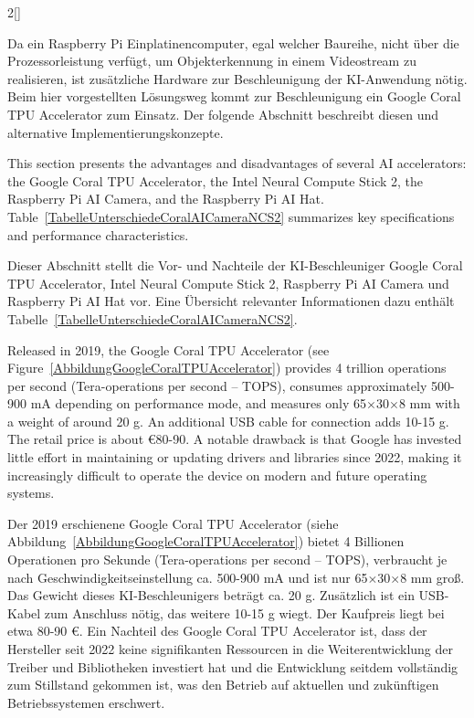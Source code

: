 \begin{paracol}{2}[]
\colger

Da ein Raspberry Pi Einplatinencomputer, egal welcher Baureihe, nicht über die Prozessorleistung verfügt, um Objekterkennung in einem Videostream zu realisieren, ist zusätzliche Hardware zur Beschleunigung der KI-Anwendung nötig. Beim hier vorgestellten Lösungsweg kommt zur Beschleunigung ein Google Coral TPU Accelerator zum Einsatz. Der folgende Abschnitt beschreibt diesen und alternative Implementierungskonzepte.

\colende

\renewcommand{\deutschertitel}{Vergleich von KI-Beschleunigern}
\renewcommand{\englischertitel}{Comparison of AI Accelerators}
\makrounterabschnitt
\label{AbschnittKIBeschleunigerVergleich}

This section presents the advantages and disadvantages of several AI accelerators: the Google Coral TPU Accelerator, the Intel Neural Compute Stick 2, the Raspberry Pi AI Camera, and the Raspberry Pi AI Hat. Table~\ref{TabelleUnterschiedeCoralAICameraNCS2} summarizes key specifications and performance characteristics.

\colger

Dieser Abschnitt stellt die Vor- und Nachteile der KI-Beschleuniger Google Coral TPU Accelerator, Intel Neural Compute Stick 2, Raspberry Pi AI Camera und Raspberry Pi AI Hat vor. Eine Übersicht relevanter Informationen dazu enthält Tabelle~\ref{TabelleUnterschiedeCoralAICameraNCS2}.

\coleng

Released in 2019, the Google Coral TPU Accelerator (see Figure~\ref{AbbildungGoogleCoralTPUAccelerator}) provides 4 trillion operations per second (Tera-operations per second -- TOPS), consumes approximately 500-900 mA depending on performance mode, and measures only 65\(\times\)30\(\times\)8 mm with a weight of around 20 g. An additional USB cable for connection adds 10-15 g. The retail price is about €80-90. A notable drawback is that Google has invested little effort in maintaining or updating drivers and libraries since 2022, making it increasingly difficult to operate the device on modern and future operating systems.

\colger

Der 2019 erschienene Google Coral TPU Accelerator (siehe Abbildung~\ref{AbbildungGoogleCoralTPUAccelerator}) bietet 4 Billionen Operationen pro Sekunde (Tera-operations per second -- TOPS), verbraucht je nach Geschwindigkeitseinstellung ca. 500-900 mA und ist nur 65\(\times\)30\(\times\)8 mm groß. Das Gewicht dieses KI-Beschleunigers beträgt ca. 20 g. Zusätzlich ist ein USB-Kabel zum Anschluss nötig, das weitere 10-15 g wiegt. Der Kaufpreis liegt bei etwa 80-90 €. Ein Nachteil des Google Coral TPU Accelerator ist, dass der Hersteller seit 2022 keine signifikanten Ressourcen in die Weiterentwicklung der Treiber und Bibliotheken investiert hat und die Entwicklung seitdem vollständig zum Stillstand gekommen ist, was den Betrieb auf aktuellen und zukünftigen Betriebssystemen erschwert.


\end{paracol}
